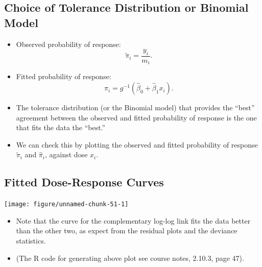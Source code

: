 \documentclass{article}\usepackage[]{graphicx}\usepackage[svgnames]{xcolor}
\newenvironment{knitrout}{}{} %
\begin{document}
\subsection*{Choice of Tolerance Distribution or Binomial Model}
\begin{itemize}
      \item Observed probability of response:
            \[ \tilde{\pi}_i=\frac{y_i}{m_i}. \]
      \item Fitted probability of response:
            \[ \hat{\pi}_i=g^{-1}(\hat{\beta}_0+\hat{\beta}_1x_i). \]
      \item The tolerance distribution (or the Binomial model) that provides the ``best''
            agreement between the observed and fitted probability of response is the one that fits the data the ``best.''
      \item We can check this by plotting the observed and fitted probability of response $ \tilde{\pi}_i $ and $ \hat{\pi}_i $,
            against dose $ x_i $.
\end{itemize}
\subsection*{Fitted Dose-Response Curves}
\begin{knitrout}
\color{fgcolor}

{\centering \texttt{[image: figure/unnamed-chunk-51-1]} 

}


\end{knitrout}
\begin{itemize}
      \item Note that the curve for the complementary log-log link fits the data better than
            the other two, as expect from the residual plots and the deviance statistics.
      \item (The R code for generating above plot see course notes, 2.10.3, page 47).
\end{itemize}
\end{document}

